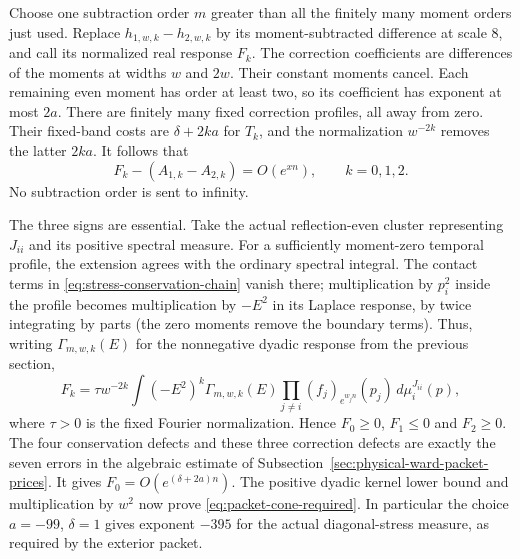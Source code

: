 Choose one subtraction order $m$ greater than all the finitely many moment
orders just used. Replace $h_{1,w,k}-h_{2,w,k}$ by its moment-subtracted
difference at scale $8$, and call its normalized real response $F_k$.
The correction coefficients are differences of the moments at widths $w$
and $2w$. Their constant moments cancel. Each remaining even moment has
order at least two, so its coefficient has exponent at most $2a$.
There are finitely many fixed correction profiles, all away from zero.
Their fixed-band costs are $\delta+2ka$ for $T_k$, and the normalization
$w^{-2k}$ removes the latter $2ka$. It follows that
\[
 F_k-(A_{1,k}-A_{2,k})=O(e^{xn}),\qquad k=0,1,2.
\]
No subtraction order is sent to infinity.

The three signs are essential. Take the actual reflection-even cluster
representing $J_{ii}$ and its positive spectral measure. For a sufficiently
moment-zero temporal profile, the extension agrees with the ordinary
spectral integral. The contact terms in
\eqref{eq:stress-conservation-chain} vanish there; multiplication by
$p_i^2$ inside the profile becomes multiplication by $-E^2$ in its Laplace
response, by twice integrating by parts (the zero moments remove the
boundary terms). Thus, writing $\Gamma_{m,w,k}(E)$ for the nonnegative
dyadic response from the previous section,
\[
 F_k=\tau w^{-2k}\int(-E^2)^k\Gamma_{m,w,k}(E)
             \prod_{j\ne i}(f_j)_{e^{w_jn}}(p_j)\,d\mu_i^{J_{ii}}(p),
\]
where $\tau>0$ is the fixed Fourier normalization. Hence $F_0\geq0$,
$F_1\leq0$ and $F_2\geq0$.
The four conservation defects and these three correction defects are
exactly the seven errors in the algebraic estimate of
Subsection~\ref{sec:physical-ward-packet-prices}. It gives
$F_0=O(e^{(\delta+2a)n})$. The positive dyadic kernel lower bound and
multiplication by $w^2$ now prove \eqref{eq:packet-cone-required}.
In particular the choice $a=-99$, $\delta=1$ gives exponent $-395$ for
the actual diagonal-stress measure, as required by the exterior packet.
